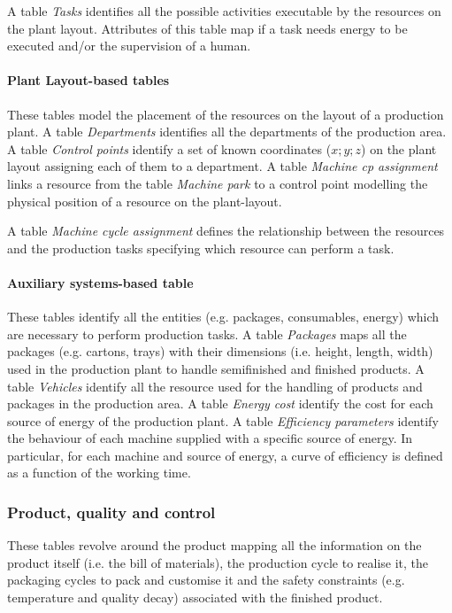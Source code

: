 A table \textit{Tasks} identifies all the possible activities executable by the resources on the plant layout. Attributes of this table map if a task needs energy to be executed and/or the supervision of a human.

\paragraph{Plant Layout-based tables}
These tables model the placement of the resources on the layout of a production plant. A table \textit{Departments} identifies all the departments of the production area. A table \textit{Control points} identify a set of known coordinates ($x;y;z$) on the plant layout assigning each of them to a department. A table \textit{Machine cp assignment} links a resource from the table \textit{Machine park} to a control point modelling the physical position of a resource on the plant-layout.\par
A table \textit{Machine cycle assignment} defines the relationship between the resources and the production tasks specifying which resource can perform a task.

\paragraph{Auxiliary systems-based table}
These tables identify all the entities (e.g. packages, consumables, energy) which are necessary to perform production tasks. A table \textit{Packages} maps all the packages (e.g. cartons, trays) with their dimensions (i.e. height, length, width) used in the production plant to handle semifinished and finished products. A table \textit{Vehicles} identify all the resource used for the handling of products and packages in the production area. A table \textit{Energy cost} identify the cost for each source of energy of the production plant. A table \textit{Efficiency parameters} identify the behaviour of each machine supplied with a specific source of energy. In particular, for each machine and source of energy, a curve of efficiency is defined as a function of the working time.

\subsubsection{Product, quality and control}
These tables revolve around the product mapping all the information on the product itself (i.e. the bill of materials), the production cycle to realise it, the packaging cycles to pack and customise it and the safety constraints (e.g. temperature and quality decay) associated with the finished product.

